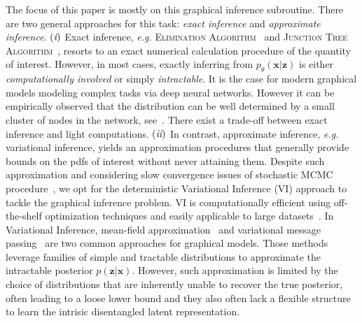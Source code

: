 \documentclass{article} %
\newcommand{\RN}[1]{%
	\textup{\lowercase\expandafter{\it \romannumeral#1}}%
}
\begin{document}
The focus of this paper is mostly on this graphical inference subroutine. 
There are two general approaches for this task: \textit{exact inference} and \textit{approximate inference}. $(\RN{1})$ Exact inference, \textit{e.g.} \textsc{Elimination Algorithm}~\citep{sanner2012symbolic} and \textsc{Junction Tree Algorithm}~\citep{kahle2008junction}, resorts to an exact numerical calculation procedure of the quantity of interest. 
However, in most cases, exactly inferring from $p_{\theta}(\mathbf{x}|\mathbf{z})$ is either \emph{computationally involved} or simply \emph{intractable}. 
It is the case for modern graphical models modeling complex tasks via deep neural networks.
However it can be empirically observed that the distribution can be well determined by a small cluster of nodes in the network, see~\citet{jordan1999introduction}. 
There exist a trade-off between exact inference and light computations. 
$(\RN{2})$ In contrast, approximate inference, \textit{e.g.} variational inference, yields an approximation procedures that generally provide bounds on the pdfs of interest without never attaining them.
Despite such approximation and considering slow convergence issues of stochastic MCMC procedure~\citep{salimans2015markov}, we opt for the deterministic Variational Inference (VI) approach to tackle the graphical inference problem.
VI is computationally efficient using off-the-shelf optimization techniques and easily applicable to large datasets~\citep{hoffman2013stochastic, kingma2013auto, liu2016stein}.
In Variational Inference, mean-field approximation~\citep{xing2012generalized} and variational message passing~\citep{winn2005variational} are two common approaches for graphical models.
Those methods leverage families of simple and tractable distributions to approximate the intractable posterior $p(\mathbf{z}|\mathbf{x})$.
However, such approximation is limited by the choice of distributions that are inherently unable to recover the true posterior, often leading to a loose lower bound and they also often lack a flexible structure to learn the intrisic disentangled latent representation. 
\end{document}
